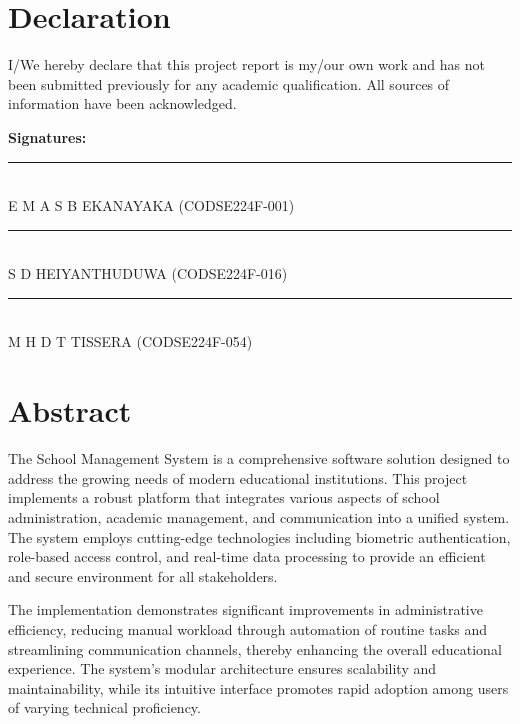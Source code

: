 \documentclass[12pt,a4paper]{report}
\begin{document}
\newpage
{} %


\section*{Declaration}
I/We hereby declare that this project report is my/our own work and has not been submitted previously for any academic qualification. All sources of information have been acknowledged.

\vspace{2cm}
\noindent\textbf{Signatures:}

\vspace{2cm}
\noindent\rule{6cm}{0.4pt}\\
\noindent E M A S B EKANAYAKA (CODSE224F-001)

\vspace{1cm}
\noindent\rule{6cm}{0.4pt}\\
\noindent S D HEIYANTHUDUWA (CODSE224F-016)

\vspace{1cm}
\noindent\rule{6cm}{0.4pt}\\
\noindent M H D T TISSERA (CODSE224F-054)

\newpage
\section*{Abstract}
The School Management System is a comprehensive software solution designed to address the growing needs of modern educational institutions. This project implements a robust platform that integrates various aspects of school administration, academic management, and communication into a unified system. The system employs cutting-edge technologies including biometric authentication, role-based access control, and real-time data processing to provide an efficient and secure environment for all stakeholders.

The implementation demonstrates significant improvements in administrative efficiency, reducing manual workload through automation of routine tasks and streamlining communication channels, thereby enhancing the overall educational experience. The system's modular architecture ensures scalability and maintainability, while its intuitive interface promotes rapid adoption among users of varying technical proficiency.
\end{document}
